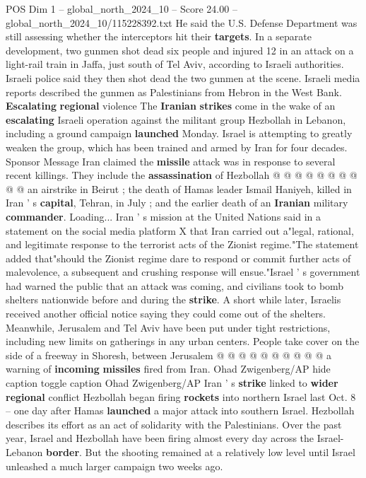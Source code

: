 \begin{textsample}{POS Dim 1 – global\_north\_2024\_10 – Score 24.00 – global\_north\_2024\_10/115228392.txt}
He said the U.S.
Defense Department was still assessing whether the interceptors hit their \textbf{targets}.
In a separate development, two gunmen shot dead six people and injured 12 in an attack on a light-rail train in Jaffa, just south of Tel Aviv, according to Israeli authorities.
Israeli police said they then shot dead the two gunmen at the scene.
Israeli media reports described the gunmen as Palestinians from Hebron in the West Bank. \textbf{Escalating} \textbf{regional} violence The \textbf{Iranian} \textbf{strikes} come in the wake of an \textbf{escalating} Israeli operation against the militant group Hezbollah in Lebanon, including a ground campaign \textbf{launched} Monday.
Israel is attempting to greatly weaken the group, which has been trained and armed by Iran for four decades.
Sponsor Message Iran claimed the \textbf{missile} attack was in response to several recent killings.
They include the \textbf{assassination} of Hezbollah @ @ @ @ @ @ @ @ @ @ an airstrike in Beirut ; the death of Hamas leader Ismail Haniyeh, killed in Iran ' s \textbf{capital}, Tehran, in July ; and the earlier death of an \textbf{Iranian} military \textbf{commander}.
Loading...
Iran ' s mission at the United Nations said in a statement on the social media platform X that Iran carried out a"legal, rational, and legitimate response to the terrorist acts of the Zionist regime."The statement added that"should the Zionist regime dare to respond or commit further acts of malevolence, a subsequent and crushing response will ensue."Israel ' s government had warned the public that an attack was coming, and civilians took to bomb shelters nationwide before and during the \textbf{strike}.
A short while later, Israelis received another official notice saying they could come out of the shelters.
Meanwhile, Jerusalem and Tel Aviv have been put under tight restrictions, including new limits on gatherings in any urban centers.
People take cover on the side of a freeway in Shoresh, between Jerusalem @ @ @ @ @ @ @ @ @ @ a warning of \textbf{incoming} \textbf{missiles} fired from Iran.
Ohad Zwigenberg/AP hide caption toggle caption Ohad Zwigenberg/AP Iran ' s \textbf{strike} linked to \textbf{wider} \textbf{regional} conflict Hezbollah began firing \textbf{rockets} into northern Israel last Oct. 8 -- one day after Hamas \textbf{launched} a major attack into southern Israel.
Hezbollah describes its effort as an act of solidarity with the Palestinians.
Over the past year, Israel and Hezbollah have been firing almost every day across the Israel-Lebanon \textbf{border}.
But the shooting remained at a relatively low level until Israel unleashed a much larger campaign two weeks ago.

\end{textsample}
